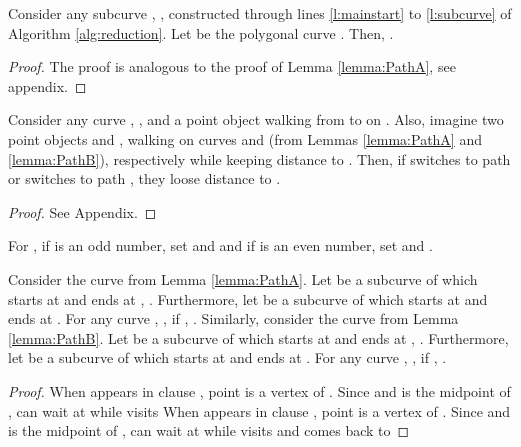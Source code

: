 \documentclass[a4paper,UKenglish]{lipics}
\newcommand{\REM}[1]{}
\begin{document}
\begin{lemma}\label{lemma:PathB}
Consider any subcurve , ,  
constructed through lines \ref{l:mainstart} to \ref{l:subcurve} 
of Algorithm \ref{alg:reduction}. Let  be the polygonal curve  . Then, .
\end{lemma}

\begin{proof}
The proof is analogous to the proof of Lemma \ref{lemma:PathA}, see appendix.
\end{proof}





	



\begin{lemma}\label{lemma:NoSwitchFromAtoB}
Consider any curve , , and 
a point object  walking from  to  on . 
Also, imagine two point objects  and 
, walking on curves  and  
(from Lemmas \ref{lemma:PathA} and \ref{lemma:PathB}), respectively
while keeping distance  to . Then,
if  switches to path  or  switches to path , 
they loose distance  to .
\REM{
take any path to a vertex on  and 
stay in distance 1 to . Similarly, 
 can not take any path to a vertex on  and 
stay in distance 1 to .}
\end{lemma}

\begin{proof}
See Appendix.
\end{proof}









For , 
if  is an odd number, set  
and   and
if  is an even number, 
set  
and .




\begin{lemma}\label{lemma:ABCanSeeC}
Consider the curve  from Lemma \ref{lemma:PathA}. Let 
 be a subcurve of  which starts at  and ends at , .
Furthermore, let  be a subcurve of  which starts at  and ends at .
For any curve  , ,
if , 
. 
Similarly, consider the curve  from Lemma \ref{lemma:PathB}. Let 
 be a subcurve of  which starts at  and ends at , .
Furthermore, let  be a subcurve of  which starts at  and ends at .
For any curve  , ,
if ,   
. 

\end{lemma}

\begin{proof}
When  appears in clause , point  is 
a vertex of . 
Since  and  is the  midpoint of 
 ,
 can wait at  while  visits 
When  appears in clause , point  is 
a vertex of . 
Since  and  is the  midpoint of 
 ,
 can wait at  while  visits 
and comes back to 
\end{proof}
\end{document}
